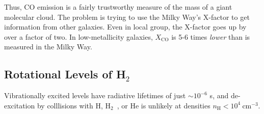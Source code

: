 \documentclass[10pt]{article}
\numberwithin{equation}{section}
\newcommand{\n}{\noindent}
\newcommand{\Htwo}{H$_2$\ }
\begin{document}
  \n Thus, CO emission is a fairly trustworthy measure of the mass of a giant molecular cloud. The problem is trying to use the Milky Way's X-factor to get information from other galaxies. Even in local group, the X-factor goes up by over a factor of two. In low-metallicity galaxies, $X_{\mathrm{CO}}$ is 5-6 times \emph{lower} than is measured in the Milky Way.
  \subsection{Rotational Levels of \Htwo} %
  \label{sub:rotational_levels_of_htwo}
  Vibrationally excited levels have radiative lifetimes of just $\sim 10^{-6}$ s, and de-excitation by colllisions with H, \Htwo, or He is unlikely at densities $n_{\mathrm{H}}<10^4\ \mathrm{cm^{-3}}$. 

\end{document}
